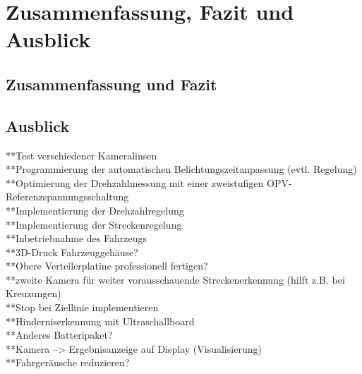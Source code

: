 

\pagestyle{fancy}
\rhead{\thepage} \chead{} 
\cfoot{}

\section{Zusammenfassung, Fazit und Ausblick}\label{Sec11}


\subsection{Zusammenfassung und Fazit}\label{Sec11Sub1}

\subsection{Ausblick}\label{Sec11Sub2}
**Test verschiedener Kameralinsen\\
**Programmierung der automatischen Belichtungszeitanpassung (evtl. Regelung)\\
**Optimierung der Drehzahlmessung mit einer zweistufigen OPV-Referenzspannungsschaltung\\
**Implementierung der Drehzahlregelung\\
**Implementierung der Streckenregelung\\
**Inbetriebnahme des Fahrzeugs\\
**3D-Druck Fahrzeuggehäuse?\\
**Obere Verteilerplatine professionell fertigen?\\
**zweite Kamera für weiter vorausschauende Streckenerkennung (hilft z.B. bei Kreuzungen)\\
**Stop bei Ziellinie implementieren\\
**Hinderniserkennung mit Ultraschallboard\\
**Anderes Batteripaket?\\
**Kamera --> Ergebnisanzeige auf Display (Visualisierung)\\
**Fahrgeräusche reduzieren?\\


\newpage